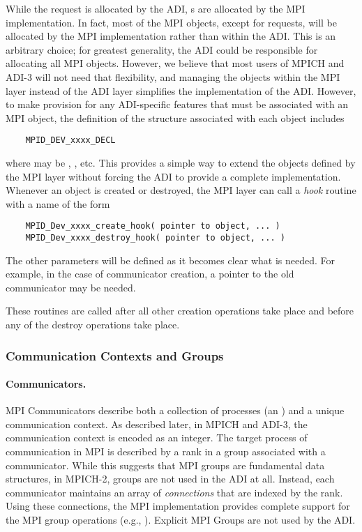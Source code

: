 While the request is allocated by the ADI, s are
allocated by the MPI implementation.  In fact, most of the MPI
objects, except for requests, will be allocated by the MPI
implementation rather than within the ADI.  This is an arbitrary
choice; for greatest generality, the ADI could be responsible for
allocating all MPI objects.  However, we believe that most users of
MPICH and ADI-3 will not need that flexibility, and managing the
objects within the MPI layer instead of the ADI layer simplifies the
implementation of the ADI.  However, to make provision for any
ADI-specific features that must be associated with an MPI object, the
definition of the structure associated with each object includes
\begin{verbatim}
    MPID_DEV_xxxx_DECL
\end{verbatim}
where  may be , , etc.  This
provides a simple way to extend the objects defined by the MPI layer
without forcing the ADI to provide a complete implementation.
Whenever an object is created or destroyed, the MPI layer can call a
\emph{hook} routine with a name of the form
\begin{verbatim}
    MPID_Dev_xxxx_create_hook( pointer to object, ... )
    MPID_Dev_xxxx_destroy_hook( pointer to object, ... )
\end{verbatim}
The other parameters will be defined as it becomes clear what is needed.  For
example, in the case of communicator creation, a pointer to the old
communicator may be needed.

These routines are called after all other creation operations take
place and before any of the destroy operations take place.

\subsubsection{Communication Contexts and Groups}

\paragraph{Communicators.}

MPI Communicators describe both a collection of processes (an
) and a unique communication context.  As described
later, in MPICH and ADI-3, the communication context is encoded as an
integer.  The target process of communication in MPI is described by a
rank in a group associated with a communicator.  While this suggests
that MPI groups are fundamental data structures, in MPICH-2, groups
are not used in the ADI at all.  Instead, each communicator maintains
an array of \emph{connections} that are indexed by the rank.
Using these connections, the MPI implementation provides complete
support for the MPI group 
operations (e.g., ).  Explicit MPI Groups are
not used by the ADI.

